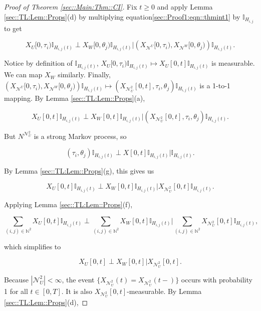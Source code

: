 \documentclass[12pt]{article}
\newcommand{\mb}{\mathbb}
\newcommand{\mc}{\mathcal}
\newcommand{\ind}{\hspace{24pt}}
\renewcommand{\U}{U}							%
\newcommand{\UU}{W}								%
\newcommand{\T}{T}								%
\renewcommand{\t}{t}							%
\newcommand{\X}{X}								%
\newcommand{\neigh}{\mc{N}}						%
\newcommand{\dneigh}{\mc{N}^2}					%
\newcommand{\vind}[1]{^{#1}}					%
\newcommand{\cind}[1]{_{#1}}					%
\newcommand{\tp}[1]{(#1)}						%
\newcommand{\tip}[1]{#1}						%
\newcommand{\poiss}{N}							%
\newcommand{\indx}[1]{_{#1}}					%
\newcommand{\dnvind}[1]{_{#1}}					%
\newcommand{\rt}{\tau}							%
\newcommand{\rtt}{\theta}						%
\newcommand{\pathseted}[2]{H_{#1,#2}}			%
\begin{document}
\begin{proof}[Proof of Theorem \ref{sec::Main:Thm::CI}]
\ind Fix \(\t \geq 0\) and apply Lemma \ref{sec::TL:Lem::Props}(d) by multiplying equation\eqref{sec::Proof1:eqn::thmint1} by \(\mb{I}_{\pathseted{i}{j}}\) to get

\[\X\cind{\U}\tip{[0,\rt\indx{i})}\mb{I}_{\pathseted{i}{j}(\t)}\perp\X\cind{\UU}\tip{[0,\rtt\indx{j})}\mb{I}_{\pathseted{i}{j}(\t)}\big|\left(\X\cind{\neigh\vind{\U}}\tip{[0,\rt\indx{i})},\X\cind{\neigh\vind{\UU}}\tip{[0,\rtt\indx{j})}\right)\mb{I}_{\pathseted{i}{j}(\t)}.\]


Notice by definition of \(\mb{I}_{\pathseted{i}{j}(\t)}\), \(\X\cind{\U}\tip{[0,\rt\indx{i})}\mb{I}_{\pathseted{i}{j}(\t)} \mapsto \X\cind{\U}\tip{[0,\t]}\mb{I}_{\pathseted{i}{j}(\t)}\) is measurable. We can map \(\X\cind{\UU}\) similarly. Finally, \(\left(\X\cind{\neigh\vind{\U}}\tip{[0,\rt\indx{i})},\X\cind{\neigh\vind{\UU}}\tip{[0,\rtt\indx{j})}\right)\mb{I}_{\pathseted{i}{j}(\t)}\mapsto (\X\cind{\dneigh\dnvind{\U}}\tip{[0,\t]}, \rt\indx{i},\rtt\indx{j})\mb{I}_{\pathseted{i}{j}(\t)}\) is a 1-to-1 mapping. By Lemma \ref{sec::TL:Lem::Props}(a),

\[\X\cind{\U}\tip{[0,\t]}\mb{I}_{\pathseted{i}{j}(\t)}\perp\X\cind{\UU}\tip{[0,\t]}\mb{I}_{\pathseted{i}{j}(\t)}\big|\left(\X\cind{\dneigh\dnvind{\U}}\tip{[0,\t]},\rt\indx{i},\rtt\indx{j}\right)\mb{I}_{\pathseted{i}{j}(\t)}.\]

But \(\poiss\vind{\dneigh\dnvind{\U}}\) is a strong Markov process, so 

\[(\rt\indx{i},\rtt\indx{j})\mb{I}_{\pathseted{i}{j}(\t)}\perp \X\tip{[0,\t]}\mb{I}_{\pathseted{i}{j}(\t)}|\mb{I}_{\pathseted{i}{j}(\t)}.\]

By Lemma \ref{sec::TL:Lem::Props}(g), this gives us

\[\X\cind{\U}\tip{[0,\t]}\mb{I}_{\pathseted{i}{j}(\t)}\perp\X\cind{\UU}\tip{[0,\t]}\mb{I}_{\pathseted{i}{j}(\t)}\big|\X\cind{\dneigh\dnvind{\U}}\tip{[0,\t]}\mb{I}_{\pathseted{i}{j}(\t)}.\]

Applying Lemma \ref{sec::TL:Lem::Props}(f),

\[\sum_{(i,j)\in\mb{N}^2}\X\cind{\U}\tip{[0,\t]}\mb{I}_{\pathseted{i}{j}(\t)}\perp\sum_{(i,j)\in\mb{N}^2}\X\cind{\UU}\tip{[0,\t]}\mb{I}_{\pathseted{i}{j}(\t)}\bigg|\sum_{(i,j)\in\mb{N}^2}\X\cind{\dneigh\dnvind{\U}}\tip{[0,\t]}\mb{I}_{\pathseted{i}{j}(\t)},\]

which simplifies to 

\[\X\cind{\U}\tip{[0,\t]}\perp\X\cind{\UU}\tip{[0,\t]}\big|\X\cind{\dneigh\dnvind{\U}}\tip{[0,\t]}.\]

Because \(|\dneigh\dnvind{\U}| < \infty\), the event \(\{\X\cind{\dneigh\dnvind{\U}}\tp{\t} = \X\cind{\dneigh\dnvind{\U}}\tp{\t-}\}\) occurs with probability 1 for all \(\t \in [0,\T]\). It is also \(\X\cind{\dneigh\dnvind{\U}}\tip{[0,\t]}\)-measurable. By Lemma \ref{sec::TL:Lem::Props}(d),


\end{proof}
\end{document}
